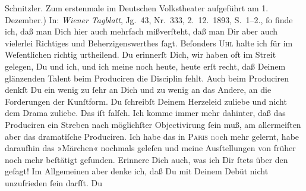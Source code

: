 {{{{                        Schnitzler. Zum erstenmale im Deutschen Volkstheater aufgeführt am 1.
                        Dezember.)} In: \emph{Wiener Tagblatt},
                     Jg. 43, Nr. 333, 2. 12. 1893,
                  S. 1–2.}}}\label{K_L02721-7}, ſo finde ich, daß man Dich hier auch mehrfach mißverſteht,
               daß man Dir aber auch vielerlei Richtiges und Beherzigenswerthes ſagt. Beſonders \textsc{Uhl} halte ich für im Weſentlichen richtig urtheilend. Du erinnerſt Dich, wir haben
               oft im Streit gelegen, Du und ich, und ich meine noch heute, heute erſt recht, daß
               Deinem glänzenden Talent beim Produciren die Disciplin fehlt. Auch beim Produciren
               denkſt Du ein wenig zu ſehr an Dich und zu wenig an das Andere, an die Forderungen
               der Kunſtform. Du ſchreibſt Deinem Herzeleid zuliebe und nicht {\pb}dem Drama zuliebe. Das iſt falſch. Ich komme immer
               mehr dahinter, daß das Produciren ein Streben nach möglichſter Objectivirung ſein
               muß, am allermeiſten aber das dramatiſche Produciren. Ich habe das in \textsc{Paris}{ }\textcolor{gray}{no}ch mehr gelernt, habe daraufhin das »Märchen« nochmals geleſen und meine Ausſtellungen von früher
               noch mehr beſtätigt gefunden. Erinnere Dich auch, was ich Dir ſtets über den \label{K_L02721-8v}\label{K_L02721-8} geſagt! Im Allgemeinen aber denke ich, daß Du mit Deinem Debüt nicht unzufrieden ſein darfſt. Du
